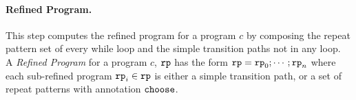 \paragraph{Refined Program.} This step computes the refined program for a program $c$ by composing the
repeat pattern set of every while loop and the simple transition paths not in any loop.
\\
A \emph{Refined Program} for a program $c$, $\mathtt{rp}$
has the form $\mathtt{rp} = \mathtt{rp}_0; \cdots; \mathtt{rp}_n$ where each sub-refined program $\mathtt{rp}_i \in \mathtt{rp}$ is either a simple transition path, or a set of repeat patterns with annotation $\mathtt{choose}$.
%

